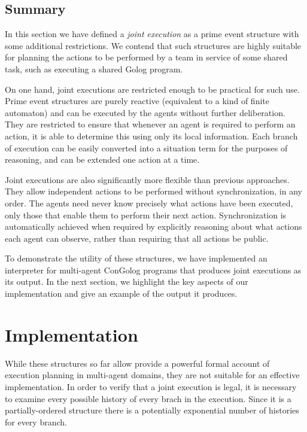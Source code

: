 \subsection{Summary\label{sec:JointExec:Summary}}

In this section we have defined a \emph{joint execution} as a prime
event structure with some additional restrictions. We contend that
such structures are highly suitable for planning the actions to be
performed by a team in service of some shared task, such as executing
a shared Golog program.

On one hand, joint executions are restricted enough to be practical
for such use. Prime event structures are purely reactive (equivalent
to a kind of finite automaton) and can be executed by the agents without
further deliberation. They are restricted to ensure that whenever
an agent is required to perform an action, it is able to determine
this using only its local information. Each branch of execution can
be easily converted into a situation term for the purposes of reasoning,
and can be extended one action at a time.

Joint executions are also significantly more flexible than previous
approaches. They allow independent actions to be performed without
synchronization, in any order. The agents need never know precisely
what actions have been executed, only those that enable them to perform
their next action. Synchronization is automatically achieved when
required by explicitly reasoning about what actions each agent can
observe, rather than requiring that all actions be public.

To demonstrate the utility of these structures, we have implemented
an interpreter for multi-agent ConGolog programs that produces joint
executions as its output. In the next section, we highlight the key
aspects of our implementation and give an example of the output it
produces.


\section{Implementation\label{sec:JointExec:Implementation}}

While these structures so far allow provide a powerful formal account
of execution planning in multi-agent domains, they are not suitable
for an effective implementation. In order to verify that a joint execution
is legal, it is necessary to examine every possible history of every
brach in the execution. Since it is a partially-ordered structure
there is a potentially exponential number of histories for every branch.


